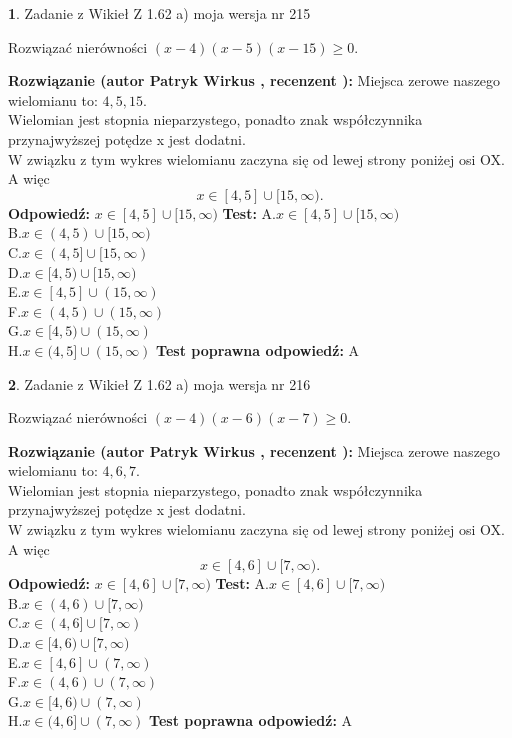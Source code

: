 \documentclass[12pt, a4paper]{article}
\theoremstyle{definition} %
\newtheorem{zad}{}
\newcommand{\zadStart}[1]{\begin{zad}#1\newline}
\newcommand{\zadStop}{\end{zad}}
\newcommand{\rozwStart}[2]{\noindent \textbf{Rozwiązanie (autor #1 , recenzent #2): }\newline}
\newcommand{\rozwStop}{\newline}
\newcommand{\odpStart}{\noindent \textbf{Odpowiedź:}\newline}
\newcommand{\odpStop}{\newline}
\newcommand{\testStart}{\noindent \textbf{Test:}\newline}
\newcommand{\testStop}{\newline}
\newcommand{\kluczStart}{\noindent \textbf{Test poprawna odpowiedź:}\newline}
\newcommand{\kluczStop}{\newline}
\begin{document}
\zadStart{Zadanie z Wikieł Z 1.62 a) moja wersja nr 215}

Rozwiązać nierówności $(x-4)(x-5)(x-15)\ge0$.
\zadStop
\rozwStart{Patryk Wirkus}{}
Miejsca zerowe naszego wielomianu to: $4, 5, 15$.\\
Wielomian jest stopnia nieparzystego, ponadto znak współczynnika przy\linebreak najwyższej potędze x jest dodatni.\\ W związku z tym wykres wielomianu zaczyna się od lewej strony poniżej osi OX. A więc $$x \in [4,5] \cup [15,\infty).$$
\rozwStop
\odpStart
$x \in [4,5] \cup [15,\infty)$
\odpStop
\testStart
A.$x \in [4,5] \cup [15,\infty)$\\
B.$x \in (4,5) \cup [15,\infty)$\\
C.$x \in (4,5] \cup [15,\infty)$\\
D.$x \in [4,5) \cup [15,\infty)$\\
E.$x \in [4,5] \cup (15,\infty)$\\
F.$x \in (4,5) \cup (15,\infty)$\\
G.$x \in [4,5) \cup (15,\infty)$\\
H.$x \in (4,5] \cup (15,\infty)$
\testStop
\kluczStart
A
\kluczStop



\zadStart{Zadanie z Wikieł Z 1.62 a) moja wersja nr 216}

Rozwiązać nierówności $(x-4)(x-6)(x-7)\ge0$.
\zadStop
\rozwStart{Patryk Wirkus}{}
Miejsca zerowe naszego wielomianu to: $4, 6, 7$.\\
Wielomian jest stopnia nieparzystego, ponadto znak współczynnika przy\linebreak najwyższej potędze x jest dodatni.\\ W związku z tym wykres wielomianu zaczyna się od lewej strony poniżej osi OX. A więc $$x \in [4,6] \cup [7,\infty).$$
\rozwStop
\odpStart
$x \in [4,6] \cup [7,\infty)$
\odpStop
\testStart
A.$x \in [4,6] \cup [7,\infty)$\\
B.$x \in (4,6) \cup [7,\infty)$\\
C.$x \in (4,6] \cup [7,\infty)$\\
D.$x \in [4,6) \cup [7,\infty)$\\
E.$x \in [4,6] \cup (7,\infty)$\\
F.$x \in (4,6) \cup (7,\infty)$\\
G.$x \in [4,6) \cup (7,\infty)$\\
H.$x \in (4,6] \cup (7,\infty)$
\testStop
\kluczStart
A
\kluczStop
\end{document}
